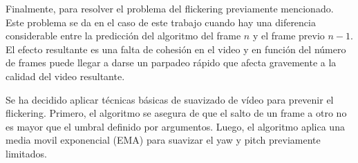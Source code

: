 
Finalmente, para resolver el problema del flickering previamente mencionado. Este problema se da en el caso de este trabajo cuando hay una diferencia considerable entre la predicción del algoritmo del frame $n$ y el frame previo $n-1$. El efecto resultante es una falta de cohesión en el video y en función del número de frames puede llegar a darse un parpadeo rápido que afecta gravemente a la calidad del video resultante. 

Se ha decidido aplicar técnicas básicas de suavizado de vídeo para prevenir el flickering. Primero, el algoritmo se asegura de que el salto de un frame a otro no es mayor que el umbral definido por argumentos. Luego, el algoritmo aplica una media movil exponencial (EMA) para suavizar el yaw y pitch previamente limitados.

